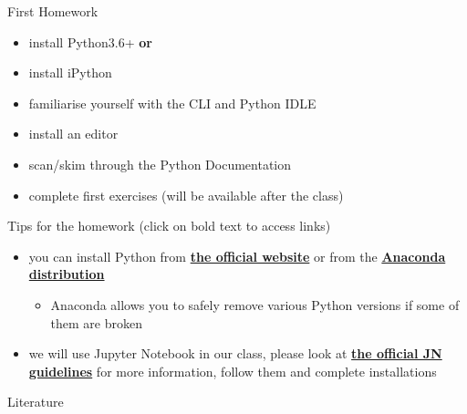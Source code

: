 \documentclass[notes=hide]{beamer}
\begin{document}
\begin{frame}{First Homework}
  \begin{itemize}
    \item install Python3.6+ \textbf{or}
    \item install iPython
    \item familiarise yourself with the CLI and Python IDLE
    \item install an editor
    \item scan/skim through the Python Documentation
    \item complete first exercises (will be available after the class)
  \end{itemize}
\end{frame}

\begin{frame}{Tips for the homework (click on bold text to access links)}
  \begin{itemize}
    \item you can install Python from \href{https://www.python.org/downloads/}{\textbf{the official website}} or from the \href{https://conda.io/docs/user-guide/install/index.html}{\textbf{Anaconda distribution}}
       	 \begin{itemize}
    	\item Anaconda allows you to safely remove various Python versions if some of them are broken
     	\end{itemize}
    \item we will use Jupyter Notebook in our class, please look at \href{https://jupyter-notebook-beginner-guide.readthedocs.io/en/latest/execute.html}{\textbf{the official JN guidelines}} for more information, follow them and complete installations
  \end{itemize}
\end{frame}



\begin{frame}{Literature}
  
  
\end{frame}
\end{document}
